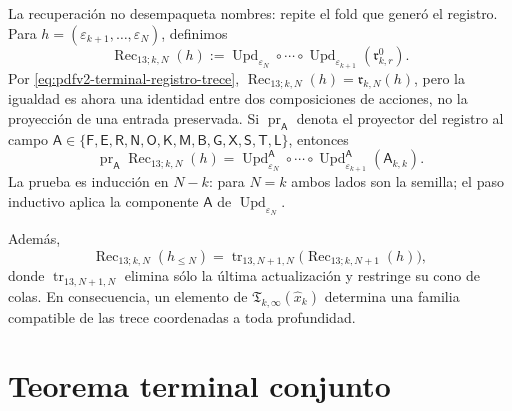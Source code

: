 La recuperaci\'on no desempaqueta nombres: repite el fold que gener\'o el
registro. Para
\(h=(\varepsilon_{k+1},\ldots,\varepsilon_N)\), definimos
\begin{equation}
\label{eq:pdfv2-terminal-recuperacion-trece}
 \boxed{
 \operatorname{Rec}_{13;k,N}(h):=
 \operatorname{Upd}_{\varepsilon_N}\circ\cdots\circ
 \operatorname{Upd}_{\varepsilon_{k+1}}
 (\mathfrak r^0_{k,r}).}
\end{equation}
Por \eqref{eq:pdfv2-terminal-registro-trece},
\(\operatorname{Rec}_{13;k,N}(h)=\mathfrak r_{k,N}(h)\), pero la igualdad
es ahora una identidad entre dos composiciones de acciones, no la
proyecci\'on de una entrada preservada. Si
\(\operatorname{pr}_{\mathsf A}\) denota el proyector del registro al campo
\(\mathsf A\in\{\mathsf F,\mathsf E,\mathsf R,\mathsf N,\mathsf O,
\mathsf K,\mathsf M,\mathsf B,\mathsf G,\mathsf X,\mathsf S,\mathsf T,
\mathsf L\}\), entonces
\begin{equation}
\label{eq:pdfv2-terminal-recuperacion-campo-fold}
 \operatorname{pr}_{\mathsf A}\operatorname{Rec}_{13;k,N}(h)
 =\operatorname{Upd}^{\mathsf A}_{\varepsilon_N}\circ\cdots\circ
  \operatorname{Upd}^{\mathsf A}_{\varepsilon_{k+1}}
  (\mathsf A_{k,k}).
\end{equation}
La prueba es inducci\'on en \(N-k\): para \(N=k\) ambos lados son la
semilla; el paso inductivo aplica la componente \(\mathsf A\) de
\(\operatorname{Upd}_{\varepsilon_N}\).

Adem\'as,
\begin{equation}
\label{eq:pdfv2-terminal-recuperacion-compatible}
 \operatorname{Rec}_{13;k,N}(h_{\leq N})
 =\operatorname{tr}_{13,N+1,N}
   \bigl(\operatorname{Rec}_{13;k,N+1}(h)\bigr),
\end{equation}
donde \(\operatorname{tr}_{13,N+1,N}\) elimina s\'olo la \'ultima
actualizaci\'on y restringe su cono de colas. En consecuencia, un elemento
de \(\mathfrak T_{k,\infty}(\widehat x_k)\) determina una familia compatible de las
trece coordenadas a toda profundidad.

\section{Teorema terminal conjunto}

